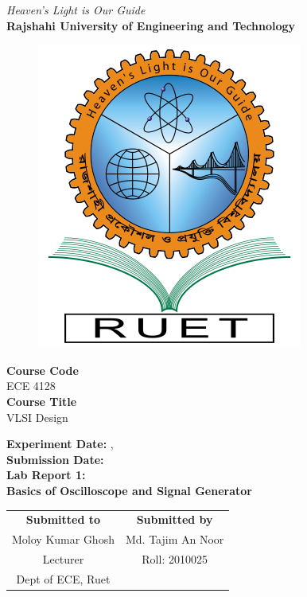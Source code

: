 \vspace*{\fill}
\begin{center}

    \emph{Heaven's Light is Our Guide} \\
    \textbf{Rajshahi University of Engineering and Technology} \\

    \begin{figure}[H]
        \centering
        \includegraphics[scale=.34]{images/RUET_logo.png}
        \label{fig:ruet_logo}
    \end{figure}
    \vspace{5mm}

    \textbf{Course Code}\\
    ECE 4128\\
    \vspace{3mm}
    \textbf{Course Title}\\
    VLSI Design

    \vspace{5mm}
    \textbf{Experiment Date:} {},\\
    \textbf{Submission Date:} {}\\

    \vspace{5mm}
    \textbf{Lab Report 1: \\
        Basics of Oscilloscope and Signal Generator}

    \vspace{15mm}

    \begin{tabular}{c|c}
        \textbf{Submitted to} & \textbf{Submitted by} \\
        Moloy Kumar Ghosh     & Md. Tajim An Noor     \\
        Lecturer              & Roll: 2010025         \\
        Dept of ECE, Ruet     &                       \\
    \end{tabular}

\end{center}
\vspace*{\fill}
